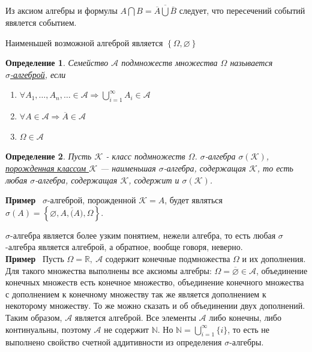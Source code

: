 \documentclass[12pt]{article}
\newtheorem{Def}{Определение}
\newenvironment{Ex}{{\bf Пример}\ }{}
\numberwithin{Th}{section}
\numberwithin{Def}{section}
\numberwithin{Lem}{section}
\numberwithin{St}{section}
\numberwithin{equation}{section}
\newcommand\Ev{\mathscr{A}}
\begin{document}
Из аксиом алгебры и формулы $A\bigcap B = \overline{\overline{A} \bigcup \overline {B}}$ следует, что пересечений событий явялется событием.

Наименьшей возможной алгеброй является $\left\{ \Omega, \varnothing \right\}$

\begin{Def}
Семейство $\Ev$ подмножеств множества $\Omega$  называется \\ \underline{$\sigma$-алгеброй}, если 
\begin{enumerate}
	\item $\forall A_1, \dots, A_n, \ldots \in \Ev \Rightarrow \bigcup\limits_{i=1}^{\infty} A_i \in \Ev$
	\item $\forall A \in \Ev \Rightarrow \overline{A} \in \Ev$
	\item $\Omega \in \Ev$
\end{enumerate}
\end{Def}

\begin{Def}
Пусть $\mathscr{K}$ - класс подмножеств $\Omega$. $\sigma$-алгебра $\sigma (\mathscr{K})$,\\ \underline{ порожденная классом $\mathscr{K}$} --- наименьшая $\sigma$-алгебра, 
содержащая $\mathscr{K}$, то есть любая $\sigma$-алгебра, содержащая $\mathscr{K}$, содержит и $\sigma (\mathscr{K})$.
\end{Def}
\begin{Ex}
$\sigma$-алгеброй, порожденной $\mathscr{K} = A$, будет являться $\sigma(A) = \left\{ \varnothing, A, \overline(A), \Omega \right\}$.
\end{Ex}

$\sigma$-алгебра является более узким понятием, нежели алгебра, то есть любая $\sigma$-алгебра является алгеброй, а обратное, вообще говоря, неверно. \\
\begin{Ex}
Пусть $\Omega = \mathbb{R},\  \Ev$ содержит конечные подмножества $\Omega$ и их дополнения. Для такого множества выполнены все аксиомы алгебры: 
$\Omega = \overline{\varnothing} \in \Ev$, объединение конечных множеств есть конечное множество, объединение конечного множества с дополнением к конечному 
множеству так же является дополнением к некоторому множеству. То же можно сказать и об объединении двух дополнений. Таким образом, $\Ev$ является алгеброй.
Все элементы $\Ev$ либо конечны, либо континуальны, поэтому $\Ev$ не содержит $\mathbb{N}$. Но $\mathbb{N} = \bigcup\limits_{i=1}^{\infty}\{i\}$, то есть
не выполнено свойство счетной аддитивности из определения $\sigma$-алгебры.
\end{Ex}
\end{document}
